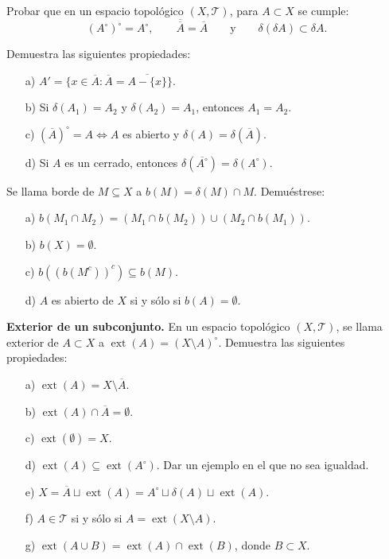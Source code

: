 \begin{ejer}[48]
Probar que en un espacio topológico $(X, \mathcal{T})$, para $A \subset X$ se cumple:
\[
    (A^\circ)^\circ = A^\circ, \qquad \overline{\overline{A}} = \overline{A} \qquad \text{y} \qquad \delta(\delta A) \subset \delta A.
\]
\end{ejer}

\begin{ejer}[49]
Demuestra las siguientes propiedades:
\begin{enumerate}
    \item[a)] $A' = \{x \in \overline{A} : \overline{A} = \overline{A - \{x\}}\}$.
    \item[b)] Si $\delta(A_1) = A_2$ y $\delta(A_2) = A_1$, entonces $A_1 = A_2$.
    \item[c)] $(\overline{A})^\circ = A \Leftrightarrow A$ es abierto y $\delta(A) = \delta(\overline{A})$.
    \item[d)] Si $A$ es un cerrado, entonces $\delta(\overline{A^\circ}) = \delta(A^\circ)$.
\end{enumerate}
\end{ejer}

\begin{ejer}[50]
Se llama borde de $M \subseteq X$ a $b(M) = \delta(M) \cap M$. Demuéstrese:
\begin{enumerate}
    \item[a)] $b(M_1 \cap M_2) = (M_1 \cap b(M_2)) \cup (M_2 \cap b(M_1))$.
    \item[b)] $b(X) = \emptyset$.
    \item[c)] $b((b(M^c))^c) \subseteq b(M)$.
    \item[d)] $A$ es abierto de $X$ si y sólo si $b(A) = \emptyset$.
\end{enumerate}
\end{ejer}

\begin{ejer}[51]
\textbf{Exterior de un subconjunto.} En un espacio topológico $(X, \mathcal{T})$, se llama exterior de $A \subset X$ a $\operatorname{ext}(A) = (X \setminus A)^\circ$. Demuestra las siguientes propiedades:
\begin{enumerate}
    \item[a)] $\operatorname{ext}(A) = X \setminus \overline{A}$.
    \item[b)] $\operatorname{ext}(A) \cap \overline{A} = \emptyset$.
    \item[c)] $\operatorname{ext}(\emptyset) = X$.
    \item[d)] $\operatorname{ext}(A) \subseteq \operatorname{ext}(A^\circ)$. Dar un ejemplo en el que no sea igualdad.
    \item[e)] $X = \overline{A} \sqcup \operatorname{ext}(A) = A^\circ \sqcup \delta(A) \sqcup \operatorname{ext}(A)$.
    \item[f)] $A \in \mathcal{T}$ si y sólo si $A = \operatorname{ext}(X \setminus A)$.
    \item[g)] $\operatorname{ext}(A \cup B) = \operatorname{ext}(A) \cap \operatorname{ext}(B)$, donde $B \subset X$.
\end{enumerate}
\end{ejer}

